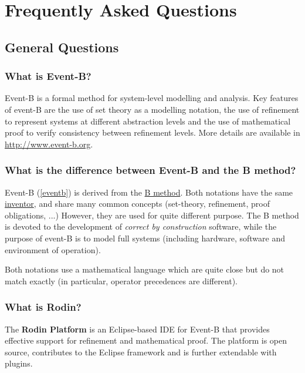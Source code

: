 \chapter{Frequently Asked Questions}
\label{faq}

\section{General Questions}

\subsection{What is Event-B?}

Event-B is a formal method for system-level modelling and analysis. Key features of event-B are the use of set theory as a modelling notation, the use of refinement to represent systems at different abstraction levels and the use of mathematical proof to verify consistency between refinement levels.
More details are available in \url{http://www.event-b.org}.

\subsection{What is the difference between Event-B and the B method?}

Event-B (\ref{eventb}) is derived from the \href{http://en.wikipedia.org/wiki/B-Method}{B method}. Both notations have the same \href{http://en.wikipedia.org/wiki/Jean-Raymond_Abrial}{inventor}, and share many common concepts (set-theory, refinement, proof obligations, ...) However, they are used for quite different purpose. The B method is devoted to the development of \textit{correct by construction} software, while the purpose of event-B is to model full systems (including hardware, software and environment of operation).

Both notations use a mathematical language which are quite close but do not match exactly (in particular, operator precedences are different).

\subsection{What is Rodin?}

The \textbf{Rodin Platform} is an Eclipse-based IDE for Event-B that provides effective support for refinement and mathematical proof. The platform is open source, contributes to the Eclipse framework and is further extendable with plugins.

